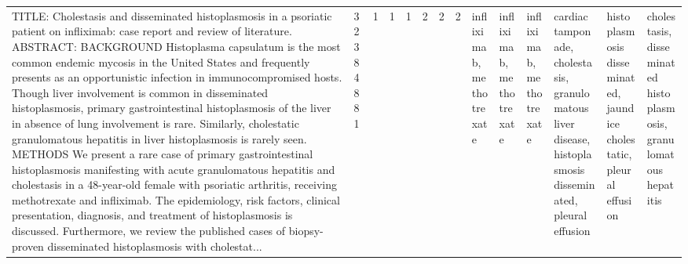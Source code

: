 \begin{longtable}{llllllllllllll}
TITLE: Cholestasis and disseminated histoplasmosis in a psoriatic patient on infliximab: case report and review of literature. ABSTRACT: BACKGROUND Histoplasma capsulatum is the most common endemic mycosis in the United States and frequently presents as an opportunistic infection in immunocompromised hosts. Though liver involvement is common in disseminated histoplasmosis, primary gastrointestinal histoplasmosis of the liver in absence of lung involvement is rare. Similarly, cholestatic granulomatous hepatitis in liver histoplasmosis is rarely seen.  METHODS We present a rare case of primary gastrointestinal histoplasmosis manifesting with acute granulomatous hepatitis and cholestasis in a 48-year-old female with psoriatic arthritis, receiving methotrexate and infliximab. The epidemiology, risk factors, clinical presentation, diagnosis, and treatment of histoplasmosis is discussed. Furthermore, we review the published cases of biopsy-proven disseminated histoplasmosis with cholestat... & 32384881 &              1 &                     1 &             1 &                 2 &                        2 &                2 &                                                                                                                                                                                                                                        infliximab, methotrexate &                                                                                          infliximab, methotrexate &                                                                                                                                                                                               infliximab, methotrexate &                                                       cardiac tamponade, cholestasis, granulomatous liver disease, histoplasmosis disseminated, pleural effusion &                                                                                                                                                                                               histoplasmosis disseminated, jaundice cholestatic, pleural effusion &                                             cholestasis, disseminated histoplasmosis, granulomatous hepatitis \\

\end{longtable}
